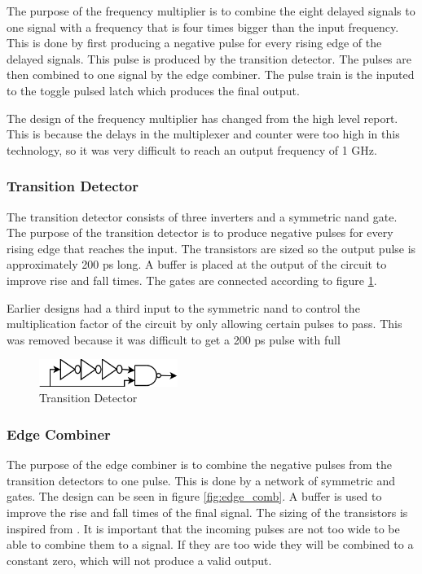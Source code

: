 \documentclass[a4paper,12pt]{article} \usepackage{graphicx}
\begin{document}
The purpose of the frequency multiplier is to combine the eight delayed signals
to one signal with a frequency that is four times bigger than the input
frequency. This is done by first producing a negative pulse for every rising
edge of the delayed signals. This pulse is produced by the transition detector.
The pulses are then combined to one signal by the edge combiner. The pulse
train is the inputed to the toggle pulsed latch which produces the final output.

The design of the frequency multiplier has changed from the high level report.
This is because the delays in the multiplexer and counter were too high in this
technology, so it was very difficult to reach an output frequency of 1 GHz.

\subsubsection{Transition Detector}
The transition detector consists of three inverters and a symmetric nand gate.
The purpose of the transition detector is to produce negative pulses for every
rising edge that reaches the input. The transistors are sized so the output
pulse is approximately 200 ps long. A buffer is placed at the output of the
circuit to improve rise and fall times.
The gates are connected according to figure \ref{fig:trans_detect}.

Earlier designs had a third input to the symmetric nand to control the
multiplication factor of the circuit by only allowing certain pulses to pass.
This was removed because it was difficult to get a 200 ps pulse with full 

\begin{figure}[p]
        \centering
        \includegraphics[width=0.4\textwidth]{../Bilder/trans_detect_trans.png}
        \caption{Transition Detector}
        \label{fig:trans_detect}
\end{figure}

\subsubsection{Edge Combiner}
The purpose of the edge combiner is to combine the negative pulses from the
transition detectors to one pulse. This is done by a network of symmetric and
gates. The design can be seen in figure \ref{fig:edge_comb}. A buffer is used to
improve the rise and fall times of the final signal.
The sizing of the transistors is inspired from \cite{dll_report}.
It is important that the incoming pulses are not too wide to be able to combine
them to a signal. If they are too wide they will be combined to a constant zero,
which will not produce a valid output.
\end{document}
